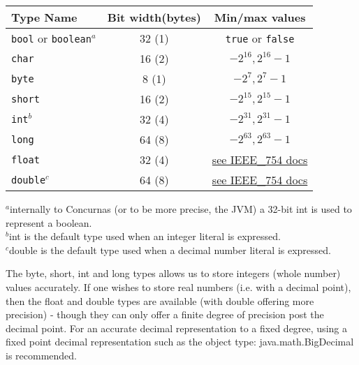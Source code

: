 \documentclass[conc-doc]{subfiles}
\begin{document}
\begin{table}[H]
	\begin{tabular*}{\textwidth}{@{\extracolsep{\fill}}lcc}
		\hline
		Type Name& Bit width(bytes)& Min/max values\\
		\hline
		\lstinline!bool! or \lstinline!boolean!$^{a}$& 32 (1) &\lstinline!true! or \lstinline!false!\\
		\lstinline!char!& 16 (2) &${-2^{16}, 2^{16} - 1}$\\
		\lstinline!byte!& 8 (1) &${-2^7, 2^7 - 1}$\\
		\lstinline!short!& 16 (2) &${-2^{15}, 2^{15} - 1}$\\
		\lstinline!int!$^{b}$& 32 (4) &${-2^{31}, 2^{31} - 1}$\\
		\lstinline!long!& 64 (8) &${-2^{63}, 2^{63} - 1}$\\
		\lstinline!float!& 32 (4) &\href{https://en.wikipedia.org/wiki/IEEE_754}{see IEEE\_754 docs}\\
		\lstinline!double!$^{c}$& 64 (8) &\href{https://en.wikipedia.org/wiki/IEEE_754}{see IEEE\_754 docs}\\
		\hline
	\end{tabular*}
	\begin{tablenotes}
		$^{a}$internally to Concurnas (or to be more precise, the JVM) a 32-bit int is used to represent a boolean.\\
		$^{b}$int is the default type used when an integer literal is expressed.\\
		$^{c}$double is the default type used when a decimal number literal is expressed.
	\end{tablenotes}
\end{table}

The byte, short, int and long types allows us to store integers (whole number) values accurately. If one wishes to store real numbers (i.e. with a decimal point), then the float and double types are available (with double offering more precision) - though they can only offer a finite degree of precision post the decimal point. For an accurate decimal representation to a fixed degree, using a fixed point decimal representation such as the object type: java.math.BigDecimal is recommended.
\end{document}
